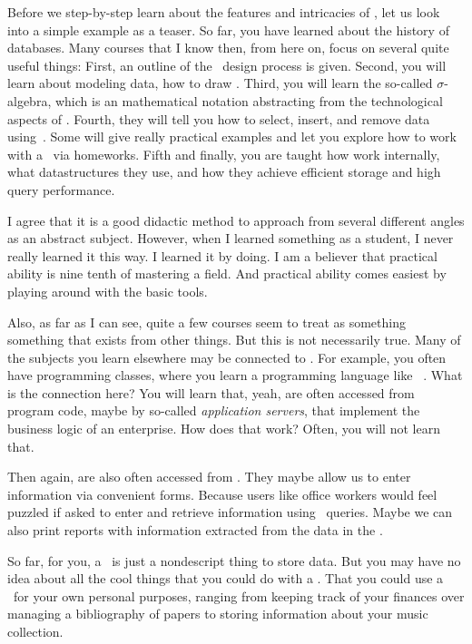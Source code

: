 Before we step-by-step learn about the features and intricacies of , let us look into a simple example as a teaser.
So far, you have learned about the history of databases.
Many courses that I know then, from here on, focus on several quite useful things:
First, an outline of the \db\ design process is given.
Second, you will learn about modeling data, how to draw .
Third, you will learn the so-called $\sigma$\nobreakdashes-algebra, which is an mathematical notation abstracting from the technological aspects of .
Fourth, they will tell you how to select, insert, and remove data using~\sql.
Some will give really practical examples and let you explore how to work with a \db\ via homeworks.
Fifth and finally, you are taught how  work internally, what datastructures they use, and how they achieve efficient storage and high query performance.

I agree that it is a good didactic method to approach  from several different angles as an abstract subject.
However, when I learned something as a student, I never really learned it this way.
I learned it by doing.
I am a believer that practical ability is nine tenth of mastering a field.
And practical ability comes easiest by playing around with the basic tools.

Also, as far as I can see, quite a few courses seem to treat  as something  something that exists  from other things.
But this is not necessarily true.
Many of the subjects you learn elsewhere may be connected to .
For example, you often have programming classes, where you learn a programming language like \python~\cite{programmingWithPython}.
What is the connection here?
You will learn that, yeah,  are often accessed from program code, maybe by so-called \emph{application servers}, that implement the business logic of an enterprise.
How does that work?
Often, you will not learn that.

Then again,  are also often accessed from .
They maybe allow us to enter information via convenient forms.
Because users like office workers would feel puzzled if asked to enter and retrieve information using \sql\ queries.
Maybe we can also print reports with information extracted from the data in the \db.

So far, for you, a \db\ is just a nondescript thing to store data.
But you may have no idea about all the cool things that you could do with a \db.
That you could use a \db\ for your own personal purposes, ranging from keeping track of your finances over managing a bibliography of papers to storing information about your music collection.

